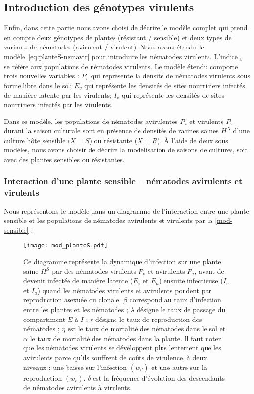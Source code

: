 	
\subsection{Introduction des génotypes virulents} \label{sec:introduction-virulents}
	
	Enfin, dans cette partie nous avons choisi de décrire le modèle complet qui  prend  en compte deux génotypes de plantes (résistant / sensible) et deux types de variants de nématodes (avirulent / virulent). Nous avons étendu le modèle~\eqref{eq:planteS-nemavir} pour introduire les nématodes virulents. L'indice $_v$   se réfère aux populations de nématodes virulents.  Le modèle étendu comporte trois nouvelles variables :  $P_v$ qui représente la densité de nématodes virulents sous forme libre dans le  sol;
$E_v$ qui représente les  densités de sites nourriciers infectés  de manière latente par les  virulents;  $I_v$ qui représente les  densités de sites nourriciers infectés par les virulents.   
	 
	Dans ce modèle, les populations de nématodes avirulentes $P_a$ et virulents $P_v$ durant la saison culturale sont en présence de  densités de racines saines $H^X$ d'une culture hôte  sensible ($X=S$)   ou résistante ($X=R$). À l'aide de deux sous modèles, nous avons choisir de décrire la modélisation de saisons de cultures,  soit avec des plantes sensibles ou résistantes.
	 

\subsubsection{Interaction d'une plante sensible -- nématodes avirulents et virulents}
	
	Nous représentons le modèle dans un diagramme de l'interaction entre une plante sensible et les populations de nématodes avirulents et virulents  par la \autoref{mod-sensible} :

\begin{figure}[H]
	\centering \texttt{[image: mod\_planteS.pdf]}
		\caption[Modèle d'infection d'une plante sensible par des 
		nématodes avirulents et virulents]{
		Ce diagramme représente la dynamique d’infection sur une plante 
		saine $H^S$   par des nématodes virulents $P_v$   
	    	et avirulents $P_a$, avant de devenir infectée de manière 
	    	latente ($E_v$  et $E_a$) ensuite infectieuse ($I_v$  
		et $I_a$) quand les nématodes virulents et avirulents  pondent 
		par
		reproduction asexuée ou clonale. $\beta$ correspond au taux 
		d’infection entre les plantes et
		les nématodes ; $\lambda$ désigne le taux de passage du 
		compartiment $E$ à $I$ ; $r$ désigne le taux
		de reproduction des nématodes ; $\eta$ est le taux de mortalité 
		des nématodes dans le sol et
		$\alpha$ le taux de mortalité des nématodes dans la plante. Il 
		faut noter que les nématodes virulents se   
		développent  plus lentement que les avirulents parce qu'ils 
		souffrent de coûts de virulence, à deux niveaux : 
		une baisse sur l'infection $(w_\beta)$ 
		et une autre sur la  reproduction $(w_r)$. $\delta$ est la 
		fréquence d’évolution des descendants de nématodes avirulents à 
		virulents.}
		\label{mod-sensible}
\end{figure}
	
